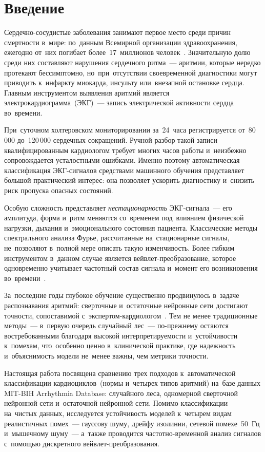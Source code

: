 \section{Введение}
\label{sec:Chapter0}

Сердечно-сосудистые заболевания занимают первое место среди причин смертности
в~мире: по~данным Всемирной организации здравоохранения, ежегодно от~них
погибает более~17~миллионов человек~\cite{who2021}.
Значительную долю среди них составляют нарушения сердечного ритма~--- аритмии,
которые нередко протекают бессимптомно, но~при~отсутствии своевременной диагностики
могут приводить к~инфаркту миокарда, инсульту или~внезапной остановке сердца.
Главным инструментом выявления аритмий является электрокардиограмма~(ЭКГ)~---
запись электрической активности сердца во~времени.

При~суточном холтеровском мониторировании за~24~часа регистрируется от~80\,000
до~120\,000 сердечных сокращений.
Ручной разбор такой записи квалифицированным кардиологом требует многих часов работы
и~неизбежно сопровождается усталостными ошибками.
Именно поэтому автоматическая классификация ЭКГ-сигналов средствами машинного
обучения представляет большой практический интерес: она позволяет ускорить
диагностику и~снизить риск пропуска опасных состояний.

Особую сложность представляет \textit{нестационарность} ЭКГ-сигнала~---
его амплитуда, форма и~ритм меняются со~временем под~влиянием физической нагрузки,
дыхания и~эмоционального состояния пациента.
Классические методы спектрального анализа Фурье, рассчитанные на~стационарные сигналы,
не~позволяют в~полной мере описать такую изменчивость.
Более гибким инструментом в~данном случае является вейвлет-преобразование,
которое одновременно учитывает частотный состав сигнала и~момент его
возникновения во~времени~\cite{zakharova2018}.

За~последние годы глубокое обучение существенно продвинулось в~задаче
распознавания аритмий: сверточные и~остаточные нейронные сети достигают точности,
сопоставимой с~экспертом-кардиологом~\cite{hannun2019}.
Тем не менее традиционные методы~--- в~первую очередь случайный лес~---
по-прежнему остаются востребованными благодаря высокой интерпретируемости
и~устойчивости к~помехам, что~особенно ценно в~клинической практике,
где надежность и~объяснимость модели не~менее важны, чем метрики точности.

Настоящая работа посвящена сравнению трех подходов к~автоматической классификации
кардиоциклов~(нормы и~четырех типов аритмий) на~базе данных MIT-BIH Arrhythmia
Database: случайного леса, одномерной сверточной нейронной сети и~остаточной
нейронной сети.
Помимо классификации на~чистых данных, исследуется устойчивость моделей
к~четырем видам реалистичных помех~--- гауссову шуму, дрейфу изолинии,
сетевой помехе~50~Гц и~мышечному шуму~--- а~также проводится
частотно-временной анализ сигналов с~помощью дискретного вейвлет-преобразования.

